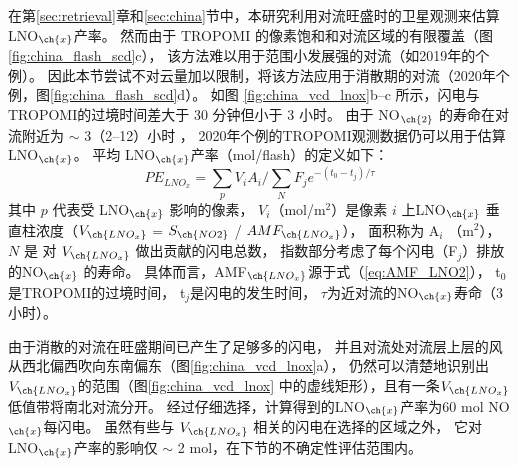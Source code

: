 在第\ref{sec:retrieval}章和\ref{sec:china}节中，本研究利用对流旺盛时的卫星观测来估算 LNO$_{\ch{x}}$产率。
然而由于 TROPOMI 的像素饱和和对流区域的有限覆盖（图\ref{fig:china_flash_scd}c），
该方法难以用于范围小发展强的对流（如2019年的个例）。
因此本节尝试不对云量加以限制，将该方法应用于消散期的对流（2020年个例，图\ref{fig:china_flash_scd}d）。
如图 \ref{fig:china_vcd_lnox}b--c 所示，闪电与TROPOMI的过境时间差大于 30 分钟但小于 3 小时。
由于 NO$_{\ch{2}}$ 的寿命在对流附近为 $\sim$ 3（2--12）小时 \citep{Nault.2016}，
2020年个例的TROPOMI观测数据仍可以用于估算LNO$_{\ch{x}}$。
平均 LNO$_{\ch{x}}$产率（mol/flash）的定义如下：
\begin{equation} \label{eq:lnox}
PE_{LNO_x} = \sum_{p} V_i A_i / \sum_{N} F_j e^{-(t_0 - t_j) / \tau}
\end{equation}
其中 $p$ 代表受 LNO$_{\ch{x}}$ 影响的像素，
$V_i$（mol/m$^2$）是像素 $i$ 上LNO$_{\ch{x}}$ 垂直柱浓度（$V_{\ch{LNO_x}}$ = $S_{\ch{NO2}}$ / $AMF_{\ch{LNO_x}}$），
面积称为 A$_i$ （m$^2$），
$N$ 是 对 $V_{\ch{LNO_x}}$ 做出贡献的闪电总数，
指数部分考虑了每个闪电（F$_j$）排放的NO$_{\ch{x}}$ 的寿命。
具体而言，AMF$_{\ch{LNO_x}}$源于式（\ref{eq:AMF_LNO2}），
t$_0$是TROPOMI的过境时间，
t$_j$是闪电的发生时间，
$\tau$为近对流的NO$_{\ch{x}}$寿命（3 小时）。

由于消散的对流在旺盛期间已产生了足够多的闪电，
并且对流处对流层上层的风从西北偏西吹向东南偏东（图\ref{fig:china_vcd_lnox}a），
仍然可以清楚地识别出$V_{\ch{LNO_x}}$的范围（图\ref{fig:china_vcd_lnox} 中的虚线矩形），且有一条$V_{\ch{LNO_x}}$低值带将南北对流分开。
经过仔细选择，计算得到的LNO$_{\ch{x}}$产率为60 mol NO$_{\ch{x}}$每闪电。
虽然有些与 $V_{\ch{LNO_x}}$ 相关的闪电在选择的区域之外，
它对LNO$_{\ch{x}}$产率的影响仅 $\sim$ 2 mol，在下节的不确定性评估范围内。




